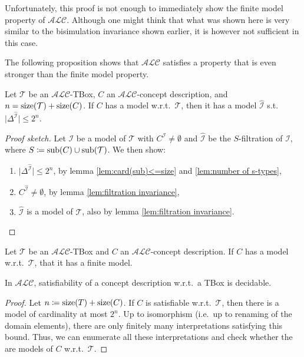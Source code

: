 Unfortunately, this proof is not enough to immediately show the finite model property of $\mathcal{ALC}$.
Although one might think that what was shown here is very similar to the bisimulation invariance shown earlier,
it is however not sufficient in this case.

The following proposition shows that $\mathcal{ALC}$ satisfies a property that is even stronger than the finite model property.
\begin{theorem}
	Let $\mathcal{T}$ be an $\mathcal{ALC}$-TBox, $C$ an $\mathcal{ALC}$-concept description, and $n = \operatorname{\text{size}}(\mathcal{T}) + \operatorname{\text{size}}(C)$.
	If $C$ has a model w.r.t.\ $\mathcal{T}$, then it has a model $\widehat{\mathcal{I}}$ s.t. $\lvert \Delta^{\widehat{\mathcal{I}}} \rvert \leq 2^n$.
\end{theorem}
\begin{proof}[Proof sketch]
	Let $\mathcal{I}$ be a model of $\mathcal{T}$ with $C^{\mathcal{I}} \neq \emptyset$ and $\widehat{\mathcal{I}}$ be the $S$-filtration of $\mathcal{I}$,
	where $S \coloneqq \operatorname{\text{sub}}(C) \cup \operatorname{\text{sub}}(\mathcal{T})$.
	We then show:
	\begin{enumerate}
		\item $\lvert \Delta^{\widehat{\mathcal{I}}} \rvert \leq 2^{n}$, by lemma \ref{lem:card(sub)<=size} and \ref{lem:number of s-types},
		\item $C^{\widehat{\mathcal{I}}} \neq \emptyset$, by lemma \ref{lem:filtration invariance},
		\item $\widehat{\mathcal{I}}$ is a model of $\mathcal{T}$, also by lemma \ref{lem:filtration invariance}.
	\end{enumerate}
\end{proof}

\begin{corollary}
	Let $\mathcal{T}$ be an $\mathcal{ALC}$-TBox and $C$ an $\mathcal{ALC}$-concept description.
	If $C$ has a model w.r.t.\ $\mathcal{T}$, that it has a finite model.
\end{corollary}

\begin{corollary}[Decidability]
	In $\mathcal{ALC}$, satisfiability of a concept description w.r.t.\ a TBox is decidable.
\end{corollary}
\begin{proof}
	Let $n \coloneqq \operatorname{\text{size}}(T) + \operatorname{\text{size}}(C)$.
	If $C$ is satisfiable w.r.t.\ $\mathcal{T}$, then there is a model of cardinality at most $2^{n}$.
	Up to isomorphism (i.e.\, up to renaming of the domain elements), there are only finitely many interpretations satisfying this bound.
	Thus, we can enumerate all these interpretations and check whether the are models of $C$ w.r.t.\ $\mathcal{T}$.
\end{proof}

